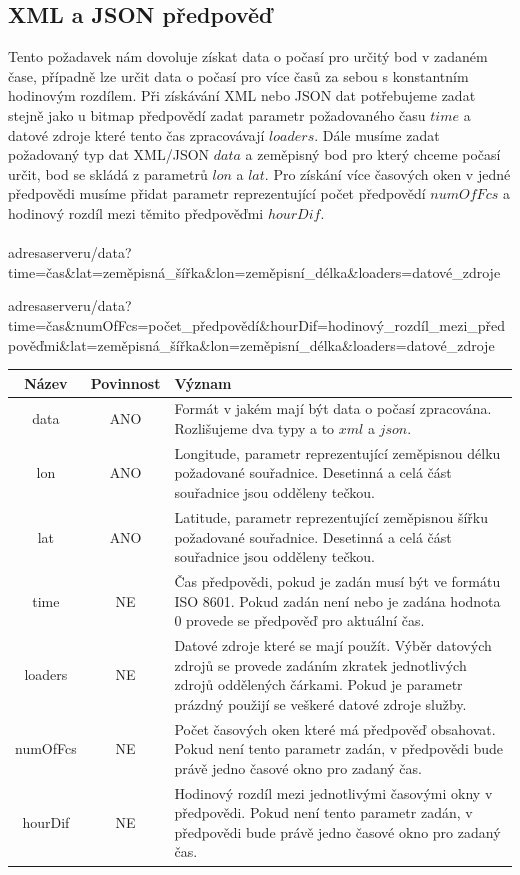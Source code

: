 \documentclass[czech,bachelor,dept460,male,csharp,cpdeclaration]{diploma}
\begin{document}
	\subsection{XML a JSON předpověď}
	
	Tento požadavek nám dovoluje získat data o počasí pro určitý bod v zadaném čase, případně lze určit data o počasí pro více časů za sebou s konstantním hodinovým rozdílem. Při získávání XML nebo JSON dat potřebujeme zadat stejně jako u bitmap předpovědí zadat parametr požadovaného času $time$ a datové zdroje které tento čas zpracovávají $loaders$. Dále musíme zadat požadovaný typ dat XML/JSON $data$ a zeměpisný bod pro který chceme počasí určit, bod se skládá z parametrů $lon$ a $lat$. Pro získání více časových oken v jedné předpovědi musíme přidat parametr reprezentující počet předpovědí $numOfFcs$ a hodinový rozdíl mezi těmito předpověďmi $hourDif$.
	\\\\
	adresaserveru/{data}?time={čas}\&lat={zeměpisná\_šířka}\&lon={zeměpisní\_délka}\&loaders={datové\_zdroje}
	
	adresaserveru/{data}?time={čas}\&numOfFcs={počet\_předpovědí}\&hourDif={hodinový\_rozdíl\_mezi\_předpověďmi}\&lat={zeměpisná\_šířka}\&lon={zeměpisní\_délka}\&loaders={datové\_zdroje}
	
	\begin{center}
		
		
		\begin{tabular}{c c p{13cm}}
			Název & Povinnost & Význam \\
			\midrule
			data & ANO & Formát v jakém mají být data o počasí zpracována. Rozlišujeme dva typy a to $xml$ a $json$.\\
			lon & ANO & Longitude, parametr reprezentující zeměpisnou délku požadované souřadnice. Desetinná a celá část souřadnice jsou odděleny tečkou.\\
			lat & ANO & Latitude, parametr reprezentující zeměpisnou šířku požadované souřadnice. Desetinná a celá část souřadnice jsou odděleny tečkou.\\
			time & NE & Čas předpovědi, pokud je zadán musí být ve formátu ISO 8601. Pokud zadán není nebo je zadána hodnota 0  provede se předpověď pro aktuální čas.\\ 
			loaders & NE & Datové zdroje které se mají použít. Výběr datových zdrojů se provede zadáním zkratek jednotlivých zdrojů oddělených čárkami. Pokud je parametr prázdný použijí se veškeré datové zdroje služby. \\
			numOfFcs & NE & Počet časových oken které má předpověď obsahovat. Pokud není tento parametr zadán, v předpovědi bude právě jedno časové okno pro zadaný čas.\\
			hourDif & NE & Hodinový rozdíl mezi jednotlivými časovými okny v předpovědi. Pokud není tento parametr zadán, v předpovědi bude právě jedno časové okno pro zadaný čas.\\
		\end{tabular}
	\end{center}
	
\end{document}
